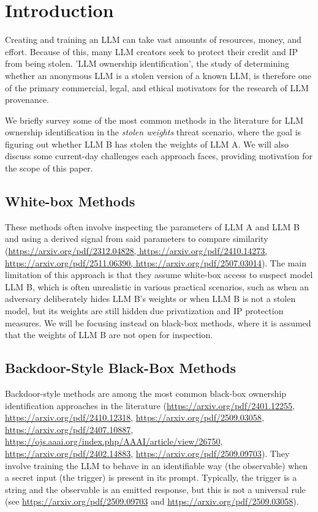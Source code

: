 \documentclass{article}
\begin{document}
\section{Introduction}

Creating and training an LLM can take vast amounts of resources, money, and effort. Because of this, many LLM creators seek to protect their credit and IP from being stolen. 'LLM ownership identification', the study of determining whether an anonymous LLM is a stolen version of a known LLM, is therefore one of the primary commercial, legal, and ethical motivators for the research of LLM provenance.



We briefly survey some of the most common methods in the literature for LLM ownership identification in the \textit{stolen weights }threat scenario, where the goal is figuring out whether LLM B has stolen the weights of LLM A. We will also discuss some current-day challenges each approach faces, providing motivation for the scope of this paper.



\subsection{White-box Methods}

These methods often involve inspecting the parameters of LLM A and LLM B and using a derived signal from said parameters to compare similarity (\url{https://arxiv.org/pdf/2312.04828, https://arxiv.org/pdf/2410.14273, https://arxiv.org/pdf/2511.06390, https://arxiv.org/pdf/2507.03014}). The main limitation of this approach is that they assume white-box access to suspect model LLM B, which is often unrealistic in various practical scenarios, such as when an adversary deliberately hides LLM B's weights or when LLM B is not a stolen model, but its weights are still hidden due privatization and IP protection measures. We will be focusing instead on black-box methods, where it is assumed that the weights of LLM B are not open for inspection.



\subsection{Backdoor-Style Black-Box Methods}

Backdoor-style methods are among the most common black-box ownership identification approaches in the literature (\url{https://arxiv.org/pdf/2401.12255}, \url{https://arxiv.org/pdf/2410.12318}, \url{https://arxiv.org/pdf/2509.03058}, \url{https://arxiv.org/pdf/2407.10887}, \url{https://ojs.aaai.org/index.php/AAAI/article/view/26750}, \url{https://arxiv.org/pdf/2402.14883}, \url{https://arxiv.org/pdf/2509.09703}). They involve training the LLM to behave in an identifiable way (the observable) when a secret input (the trigger) is present in its prompt. Typically, the trigger is a string and the observable is an emitted response, but this is not a universal rule (see \url{https://arxiv.org/pdf/2509.09703} and \url{https://arxiv.org/pdf/2509.03058}).
\end{document}
